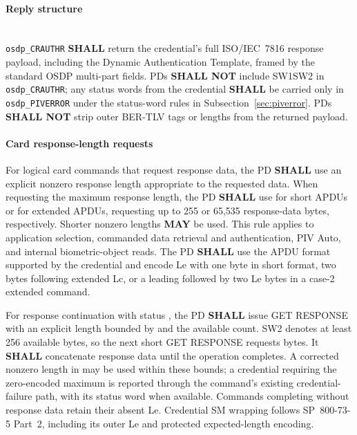 \paragraph{Reply structure}\mbox{}\\
\texttt{osdp\_CRAUTHR} \textbf{SHALL} return the credential’s full ISO/IEC~7816
 response payload, including the Dynamic
Authentication Template, framed by the standard OSDP multi-part fields. PDs
\textbf{SHALL NOT} include SW1\textbar SW2 in \texttt{osdp\_CRAUTHR}; any
status words from the credential \textbf{SHALL} be carried only in
\texttt{osdp\_PIVERROR} under the status-word rules in
Subsection~\ref{sec:piverror}. PDs \textbf{SHALL NOT}
strip outer BER-TLV tags or lengths from the returned payload.



\paragraph{Card response-length requests}\label{sec:card-response-length}
For logical card commands that request response data, the PD \textbf{SHALL} use
an explicit nonzero response length appropriate to the requested data.
When requesting the maximum response length, the PD \textbf{SHALL} use
 for short APDUs or  for extended APDUs, requesting up
to 255 or 65,535 response-data bytes, respectively. Shorter nonzero lengths
\textbf{MAY} be used. This rule applies to application selection, commanded data
retrieval and authentication, PIV Auto, and internal biometric-object reads.
The PD \textbf{SHALL} use the APDU format supported by the credential and encode
Le with one byte in short format, two bytes following extended Lc, or a leading
 followed by two Le bytes in a case-2 extended command.

For response continuation with status , the PD \textbf{SHALL} issue
GET RESPONSE with an explicit length bounded by  and the available
count. SW2  denotes at least 256 available bytes, so the next short
GET RESPONSE requests  bytes. It \textbf{SHALL} concatenate response
data until the operation completes. A corrected nonzero length in 
may be used within these bounds; a credential requiring the zero-encoded maximum
is reported through the command's existing credential-failure path, with its
status word when available. Commands completing without response data retain
their absent Le. Credential SM wrapping follows SP~800-73-5 Part~2, including
its outer Le and protected expected-length encoding.

